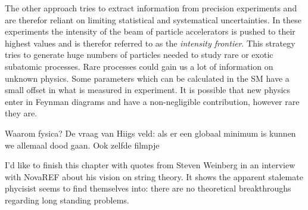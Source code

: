 The other approach tries to extract information from precision experiments and are therefor reliant on limiting statistical and systematical uncertainties. In these experiments the intensity of the beam of particle accelerators is pushed to their highest values and is therefor referred to as the \textit{intensity frontier}. This strategy tries to generate huge numbers of particles needed to study rare or exotic subatomic processes. Rare processes could gain us a lot of information on unknown physics. Some parameters which can be calculated in the SM have a small offset in what is measured in experiment. It is possible that new physics enter in Feynman diagrams and have a non-negligible contribution, however rare they are.

Waarom fysica? De vraag van Hiigs veld: als er een globaal minimum is kunnen we allemaal dood gaan. Ook zelfde filmpje





I'd like to finish this chapter with quotes from Steven Weinberg in an interview with NovaREF about his vision on string theory. It shows the apparent stalemate phycisist seems to find themselves into: there are no theoretical breakthroughs regarding long standing problems.

